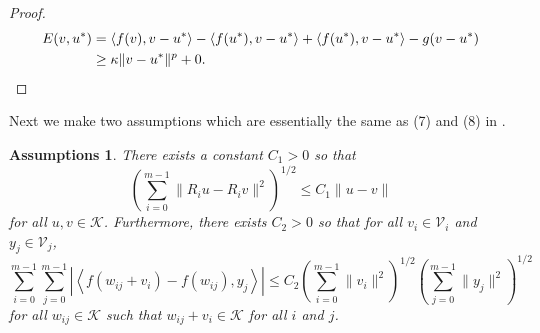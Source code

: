 \documentclass[letterpaper,final,12pt,reqno]{amsart}
\theoremstyle{cstyle}
\theoremstyle{cstyle*}
\newtheorem{assumptions*}{Assumptions}
\theoremstyle{dstyle}
\numberwithin{equation}{section}
\numberwithin{figure}{section}
\numberwithin{table}{section}
\numberwithin{theorem}{section}
\newcommand{\cK}{\mathcal{K}}
\newcommand{\cV}{\mathcal{V}}
\newcommand{\ip}[2]{\left<#1,#2\right>}
\begin{document}
\begin{proof}
\begin{align*}
E(v,u^*) &= \ip{f(v)}{v-u^*} - \ip{f(u^*)}{v-u^*} + \ip{f(u^*)}{v-u^*} - g(v-u^*) \\
   &\ge \kappa \|v-u^*\|^p + 0.  \qedhere
\end{align*}
\end{proof}

Next we make two assumptions which are essentially the same as (7) and (8) in \cite{Tai2003}.

\begin{assumptions*}  There exists a constant $C_1>0$ so that
\begin{equation}
\left(\sum_{i=0}^{m-1} \|R_i u - R_i v\|^2\right)^{1/2} \le C_1 \|u-v\| \label{as:lipschitzrestrictions}
\end{equation}
for all $u,v\in\cK$.  Furthermore, there exists $C_2>0$ so that for all $v_i \in \cV_i$ and $y_j \in \cV_j$,
\begin{equation}
\sum_{i=0}^{m-1} \sum_{j=0}^{m-1} \left|\ip{f(w_{ij} + v_i) - f(w_{ij})}{y_j}\right| \le C_2 \left(\sum_{i=0}^{m-1} \|v_i\|^2\right)^{1/2} \left(\sum_{j=0}^{m-1} \|y_j\|^2\right)^{1/2} \label{as:lipschitzresidual}
\end{equation}
for all $w_{ij} \in \cK$ such that $w_{ij} + v_i \in \cK$ for all $i$ and $j$.
\end{assumptions*}
\end{document}
